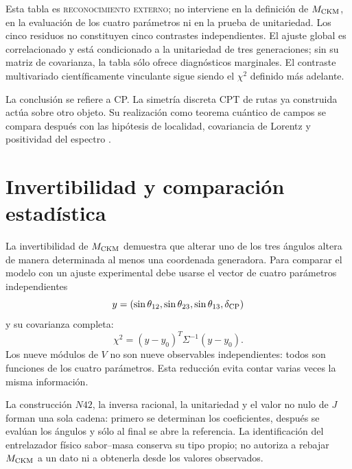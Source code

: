 Esta tabla es \textsc{reconocimiento externo}; no interviene en la
definición de \(M_{\rm CKM}\), en la evaluación de los cuatro parámetros ni
en la prueba de unitariedad. Los cinco residuos no constituyen cinco
contrastes independientes. El ajuste global es correlacionado y está
condicionado a la unitariedad de tres generaciones; sin su matriz de
covarianza, la tabla sólo ofrece diagnósticos marginales. El contraste
multivariado científicamente vinculante sigue siendo el
\(\chi^2\) definido más adelante.

La conclusión se refiere a CP\@. La simetría discreta CPT de rutas ya
construida actúa sobre otro objeto. Su realización como teorema cuántico de
campos se compara después con las hipótesis de localidad, covariancia de
Lorentz y positividad del espectro \cite{StreaterWightman2000}.

\section{Invertibilidad y comparación estadística}

La invertibilidad de \(M_{\rm CKM}\) demuestra que alterar uno de los tres
ángulos altera de manera determinada al menos una coordenada generadora. Para
comparar el modelo con un ajuste experimental debe usarse el vector de cuatro
parámetros independientes
\[
 y=(\sin\theta_{12},\sin\theta_{23},\sin\theta_{13},\delta_{\rm CP})
\]
y su covarianza completa:
\[
 \chi^2=(y-y_0)^{\!T}\Sigma^{-1}(y-y_0).
\]
Los nueve módulos de \(V\) no son nueve observables independientes: todos son
funciones de los cuatro parámetros. Esta reducción evita contar varias veces
la misma información.

La construcción \(N42\), la inversa racional, la unitariedad y el valor no
nulo de \(J\) forman una sola cadena: primero se determinan los coeficientes,
después se evalúan los ángulos y sólo al final se abre la referencia. La
identificación del entrelazador físico sabor--masa conserva su tipo propio;
no autoriza a rebajar \(M_{\rm CKM}\) a un dato ni a obtenerla desde los
valores observados.

